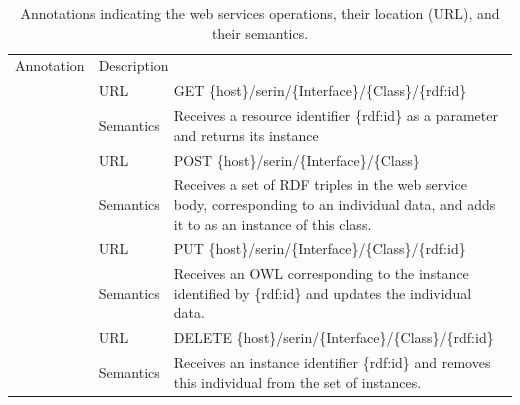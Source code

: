 \documentclass{singlecol-new}
\theoremstyle{TH}{
\newtheorem{lemma}{Lemma}
\newtheorem{theorem}[lemma]{Theorem}
\newtheorem{corrolary}[lemma]{Corrolary}
\newtheorem{conjecture}[lemma]{Conjecture}
\newtheorem{proposition}[lemma]{Proposition}
\newtheorem{claim}[lemma]{Claim}
\newtheorem{stheorem}[lemma]{Wrong Theorem}
\newtheorem{algorithm}{Algorithm}
}
\theoremstyle{THrm}{
\newtheorem{definition}{Definition}[section]
\newtheorem{question}{Question}[section]
\newtheorem{remark}{Remark}
\newtheorem{scheme}{Scheme}
}
\theoremstyle{THhit}{
\newtheorem{case}{Case}[section]
}
\begin{document}
\begin{table}[ht]
	\centering
	\caption{Annotations indicating the web services operations, their location (URL), and their semantics.}
	\label{tab:annotations-operation}
	\begin{tabular}{clp{8cm}}
		\rowcolor[HTML]{C0C0C0} 
		Annotation                                       & \multicolumn{2}{l}{\cellcolor[HTML]{C0C0C0}Description}                                                                                              \\
		\cellcolor[HTML]{CBCEFB}                         & URL       & GET \{host\}/serin/\{Interface\}/\{Class\}/\{rdf:id\}                                                                                    \\
		\rowcolor[HTML]{EFEFEF} 
		\multirow{-2}{*}{\cellcolor[HTML]{CBCEFB}GET}    & Semantics & Receives a resource identifier \{rdf:id\}  as a parameter  and returns its instance                                                      \\
		\cellcolor[HTML]{CBCEFB}                         & URL       & POST \{host\}/serin/\{Interface\}/\{Class\}                                                                                              \\
		\rowcolor[HTML]{EFEFEF} 
		\multirow{-2}{*}{\cellcolor[HTML]{CBCEFB}POST}   & Semantics & Receives a set of RDF triples in the web service body, corresponding to an individual data, and adds it to as an instance of this class. \\
		\cellcolor[HTML]{CBCEFB}                         & URL       & PUT \{host\}/serin/\{Interface\}/\{Class\}/\{rdf:id\}                                                                                    \\
		\rowcolor[HTML]{EFEFEF} 
		\multirow{-2}{*}{\cellcolor[HTML]{CBCEFB}PUT}    & Semantics & Receives an OWL corresponding to the instance identified by \{rdf:id\} and updates the individual data.                                  \\
		\cellcolor[HTML]{CBCEFB}                         & URL       & DELETE \{host\}/serin/\{Interface\}/\{Class\}/\{rdf:id\}                                                                                 \\
		\rowcolor[HTML]{EFEFEF} 
		\multirow{-2}{*}{\cellcolor[HTML]{CBCEFB}DELETE} & Semantics & Receives an instance identifier \{rdf:id\} and removes this individual from the set of instances.                                       
	\end{tabular}
\end{table}
\end{document}
